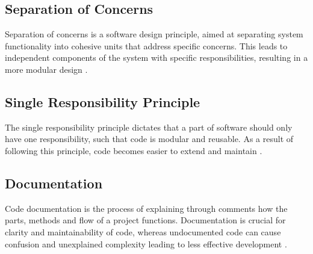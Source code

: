 \subsection{Separation of Concerns}
\label{sec:SOC_theory}

Separation of concerns is a software design principle, aimed at separating system functionality into cohesive units that address specific concerns. This leads to independent components of the system with specific responsibilities, resulting in a more modular design \parencite{separation_of_concerns}.

\subsection{Single Responsibility Principle}
\label{sec:single_responsibility_theory}

The single responsibility principle dictates that a part of software should only have one responsibility, such that code is modular and reusable. As a result of following this principle, code becomes easier to extend and maintain \parencite{single_responsibility}.

\subsection{Documentation}
\label{sec:documentation_theory}

Code documentation is the process of explaining through comments how the parts, methods and flow of a project functions. Documentation is crucial for clarity and maintainability of code, whereas undocumented code can cause confusion and unexplained complexity leading to less effective development \parencite{ibm_documentation}.

